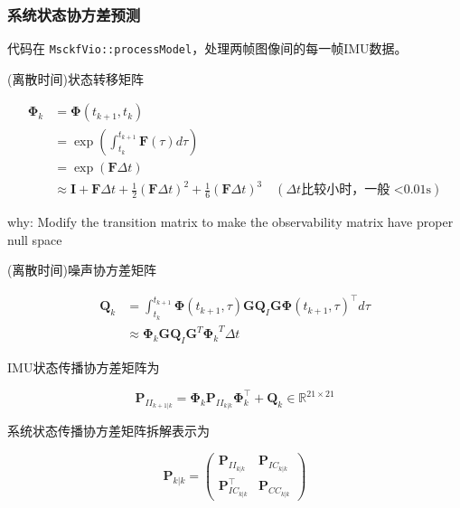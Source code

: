 \documentclass[12pt,a4paper]{article}
\begin{document}
\subsubsection{系统状态协方差预测}

代码在 \verb|MsckfVio::processModel|，处理两帧图像间的每一帧IMU数据。

(离散时间)状态转移矩阵

\begin{equation}
\begin{aligned}
\boldsymbol{\Phi}_k 
&= \boldsymbol{\Phi}(t_{k+1}, t_k) \\
&= \exp\left(\int_{t_k}^{t_{k+1}} \mathbf{F}(\tau)d\tau\right) \\
&= \exp(\mathbf{F} \Delta t) \\
&\approx 
\mathbf{I} + \mathbf{F} \Delta t + 
\frac{1}{2} (\mathbf{F} \Delta t)^2 + \frac{1}{6} (\mathbf{F} \Delta t)^3
\quad (\Delta t \text{比较小时，一般 <0.01s})
\end{aligned}
\end{equation}

{\color{red}why: Modify the transition matrix to make the observability matrix have proper null space}

(离散时间)噪声协方差矩阵

\begin{equation}
\begin{aligned}
\mathbf{Q}_k 
&=
\int_{t_k}^{t_{k+1}} \boldsymbol{\Phi}(t_{k+1},\tau)\mathbf{G}\mathbf{Q}_I\mathbf{G}\boldsymbol{\Phi}(t_{k+1},\tau)^\top d\tau \\
&\approx 
\boldsymbol{\Phi}_k \mathbf{G} \mathbf{Q}_I \mathbf{G}^T {\boldsymbol{\Phi}_k}^T \Delta t
\end{aligned}
\end{equation}

IMU状态传播协方差矩阵为

\begin{equation}
\mathbf{P}_{II_{k+1|k}} = 
\boldsymbol{\Phi}_k\mathbf{P}_{II_{k|k}}\boldsymbol{\Phi}_k^\top + \mathbf{Q}_k
\in \mathbb{R}^{21 \times 21}
\end{equation}

系统状态传播协方差矩阵拆解表示为

\begin{equation}
\mathbf{P}_{k|k} = 
\begin{pmatrix}
\mathbf{P}_{II_{k|k}} & \mathbf{P}_{IC_{k|k}} \\
\mathbf{P}_{IC_{k|k}}^\top & \mathbf{P}_{CC_{k|k}}
\end{pmatrix}
\end{equation}
\end{document}
